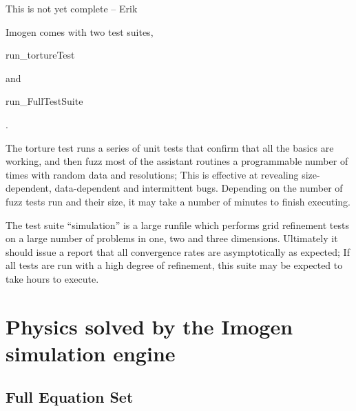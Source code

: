 \documentclass[letterpaper,12pt]{article}
\begin{document}
\begin{textbf}This is not yet complete -- Erik \end{textbf}

Imogen comes with two test suites, \begin{tt}run\_tortureTest\end{tt} and \begin{tt}run\_FullTestSuite\end{tt}.

The torture test runs a series of unit tests that confirm that all the basics are working, and
then fuzz most of the assistant routines a programmable number of times with random data and
resolutions; This is effective at revealing size-dependent, data-dependent and intermittent bugs.
Depending on the number of fuzz tests run and their size, it may take a number of minutes
to finish executing.

The test suite ``simulation'' is a large runfile which performs grid refinement tests on a large
number of problems in one, two and three dimensions. Ultimately it should issue a report
that all convergence rates are asymptotically as expected; If all tests are run with a high
degree of refinement, this suite may be expected to take hours to execute.

\section{Physics solved by the Imogen simulation engine}

\subsection{Full Equation Set}
\end{document}
